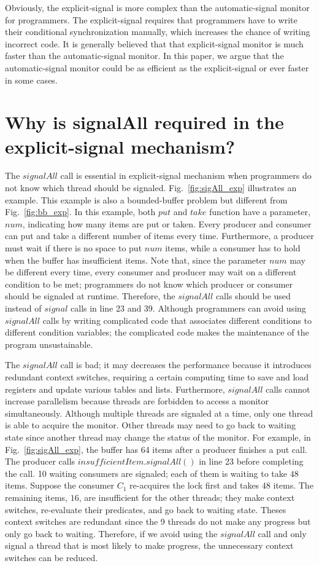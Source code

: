 \documentclass[preprint]{sigplanconf}
\begin{document}
Obviously, the explicit-signal is more complex than the automatic-signal monitor 
for programmers. The explicit-signal requires that programmers
have to write their conditional synchronization manually, which increases the 
chance of writing incorrect code. It is generally believed that that 
explicit-signal 
monitor is much faster than the automatic-signal monitor. In this paper, we 
argue that the automatic-signal monitor could be as efficient as the
explicit-signal or ever faster in some cases. 

\section{Why is signalAll required in the explicit-signal mechanism?} 
\label{sec:sigAll}
The $signalAll$ call is essential in explicit-signal mechanism when programmers
do not know which thread should be signaled. Fig.~\ref{fig:sigAll_exp}
illustrates an example. This example is also a bounded-buffer problem but 
different from Fig.~\ref{fig:bb_exp}. In this example, both $put$ and $take$
function have a parameter, $num$, indicating how many items are put or taken. 
Every producer and consumer can put and take a different number of items
every time.  Furthermore, a producer must wait if there is no space to put
$num$ items, while a consumer has to hold when the buffer has insufficient items.
Note that, since the parameter $num$ may be different every time, every 
consumer and producer may wait on a different condition to be met; programmers 
do not know which producer or consumer should be signaled at runtime. 
Therefore, the $signalAll$ calls should be used instead of $signal$ calls in
line 23 and 39.
Although programmers can avoid using $signalAll$ calls by writing
complicated code that associates different conditions to different condition 
variables; the complicated code makes the maintenance of the program
unsustainable. 

The $signalAll$ call is bad; it may decreases the performance because 
it introduces redundant context switches, requiring a certain 
computing time to save and load registers and update various tables and lists.
Furthermore, $signalAll$ calls cannot increase parallelism because threads
are forbidden to access a monitor simultaneously. Although multiple threads are
signaled at a time, only one thread is able to acquire the monitor. Other 
threads may need to go back to waiting state since another thread may change 
the status of the monitor. For example, in Fig.~\ref{fig:sigAll_exp}, the 
buffer has 64 items after a producer finishes a put call. The producer calls 
$insufficientItem.signalAll()$ in line 23 before completing the call. 10  
waiting consumers are signaled; each of them is waiting to take $48$ items.
Suppose the consumer $C_1$ re-acquires the lock first and takes $48$ items. The
remaining items, $16$, are insufficient for the other threads; they
make context switches, re-evaluate their predicates, and go back to waiting 
state. Theses context switches are redundant since the 9 threads do not 
make any progress but only go back to waiting. 
Therefore, if we avoid using the $signalAll$ call and only signal a thread that 
is most likely to make progress, the unnecessary context switches can be
reduced.
\end{document}
